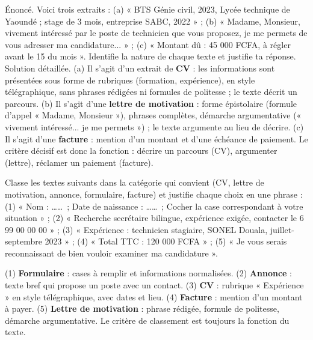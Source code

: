 \documentclass[11pt]{article}
\begin{document}
\begin{exoresolu}
Énoncé. Voici trois extraits : (a) « BTS Génie civil, 2023, Lycée technique de Yaoundé ; stage de 3 mois, entreprise SABC, 2022 » ; (b) « Madame, Monsieur, vivement intéressé par le poste de technicien que vous proposez, je me permets de vous adresser ma candidature... » ; (c) « Montant dû : 45 000 FCFA, à régler avant le 15 du mois ». Identifie la nature de chaque texte et justifie ta réponse.
\tcblower
Solution détaillée. (a) Il s'agit d'un extrait de \textbf{CV} : les informations sont présentées sous forme de rubriques (formation, expérience), en style télégraphique, sans phrases rédigées ni formules de politesse ; le texte décrit un parcours. (b) Il s'agit d'une \textbf{lettre de motivation} : forme épistolaire (formule d'appel « Madame, Monsieur »), phrases complètes, démarche argumentative (« vivement intéressé... je me permets ») ; le texte argumente au lieu de décrire. (c) Il s'agit d'une \textbf{facture} : mention d'un montant et d'une échéance de paiement. Le critère décisif est donc la fonction : décrire un parcours (CV), argumenter (lettre), réclamer un paiement (facture).
\end{exoresolu}

\begin{exercice}
Classe les textes suivants dans la catégorie qui convient (CV, lettre de motivation, annonce, formulaire, facture) et justifie chaque choix en une phrase : (1) « Nom : \ldots\ldots\ ; Date de naissance : \ldots\ldots\ ; Cocher la case correspondant à votre situation » ; (2) « Recherche secrétaire bilingue, expérience exigée, contacter le 6 99 00 00 00 » ; (3) « Expérience : technicien stagiaire, SONEL Douala, juillet-septembre 2023 » ; (4) « Total TTC : 120 000 FCFA » ; (5) « Je vous serais reconnaissant de bien vouloir examiner ma candidature ».
\end{exercice}

\begin{corrige}
(1) \textbf{Formulaire} : cases à remplir et informations normalisées. (2) \textbf{Annonce} : texte bref qui propose un poste avec un contact. (3) \textbf{CV} : rubrique « Expérience » en style télégraphique, avec dates et lieu. (4) \textbf{Facture} : mention d'un montant à payer. (5) \textbf{Lettre de motivation} : phrase rédigée, formule de politesse, démarche argumentative. Le critère de classement est toujours la fonction du texte.
\end{corrige}
\end{document}
